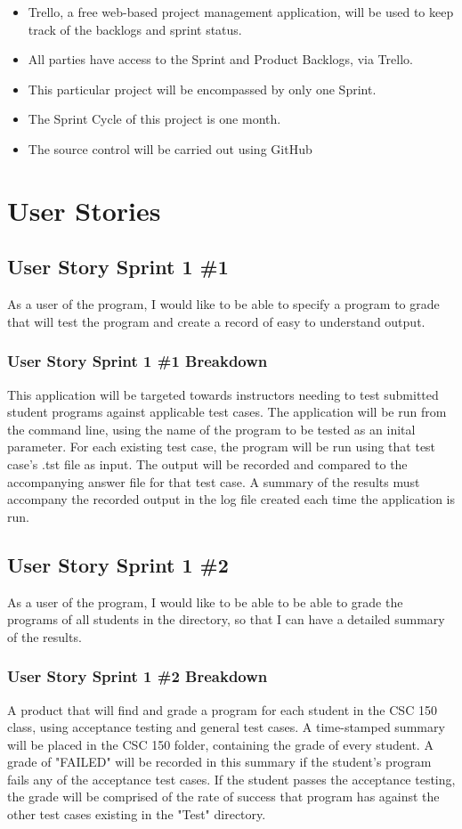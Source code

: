  
\begin{itemize}
\item Trello, a free web-based project management application, will be used to keep
         track of the backlogs and sprint status.
\item All parties have access to the Sprint and Product Backlogs, via Trello.
\item This particular project will be encompassed by only one Sprint.
\item The Sprint Cycle of this project is one month.
\item The source control will be carried out using GitHub
\end{itemize}

\section{User Stories}

\subsection{User Story Sprint 1 \#1}
As a user of the program, I would like to be able to specify a program to grade that will test the program and create a record of easy to understand output.

\subsubsection{User Story Sprint 1 \#1 Breakdown}
This application will be targeted towards instructors needing to test submitted student programs against applicable test
cases.  The application will be run from the command line, using the name of the program to be tested as an inital parameter.
For each existing test case, the program will be run using that test case's .tst file as input.  The output will be recorded and 
compared to the accompanying answer file for that test case.  A summary of the results must accompany the recorded
output in the log file created each time the application is run.


\subsection{User Story Sprint 1 \#2} 
As a user of the program, I would like to be able to be able to grade the programs of all students in the directory, so that I can have a detailed summary of the results.
\subsubsection{User Story Sprint 1 \#2 Breakdown}
A product that will find and grade a program for each student in the CSC 150 class, using acceptance testing and general test cases. A time-stamped summary will be placed in the CSC 150 folder, containing the grade of every student.  A grade of "FAILED" will be recorded in this summary if the student's program fails any of the acceptance test cases.  If the student passes the acceptance testing, the grade will be comprised of the rate of success that program has against the other test cases existing in the "Test" directory.

